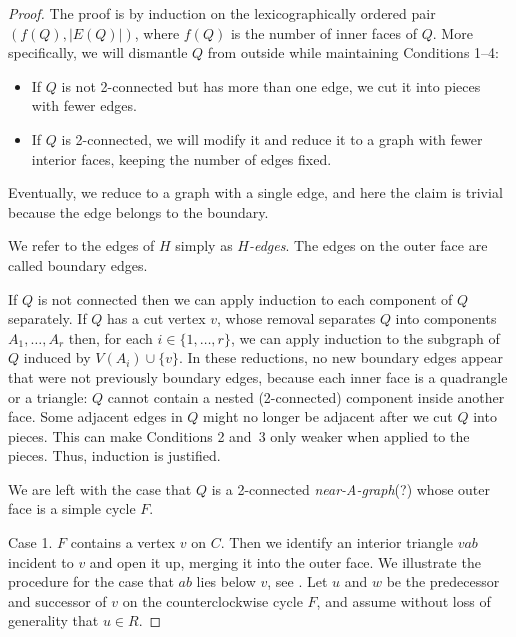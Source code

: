\documentclass{patmorin}
\begin{document}
\begin{proof}
The proof is by induction
   on the lexicographically ordered pair $(f(Q),|E(Q)|)$, where $f(Q)$
is the number of inner faces of $Q$. 
More specifically, %
we will dismantle $Q$
 from outside while maintaining
 Conditions 1--4:
\begin{itemize}
\item If $Q$ is not 2-connected but has more than one edge, we cut it
  into pieces with fewer edges.
\item If $Q$ is 2-connected, we will modify it and reduce it to a
  graph
with fewer interior faces,
keeping the number of edges fixed.
\end{itemize}
Eventually, we reduce to a graph with a single edge, and here the
claim is trivial because the edge belongs to the boundary.

   We refer to the edges of $H$ simply as \emph{$H$-edges}.
The edges on the outer
   face are called boundary edges.

If $Q$ is not connected then we can apply induction to each component
   of $Q$ separately. If $Q$ has a cut vertex $v$, whose removal
   separates $Q$ into components $A_1,\ldots,A_r$ then, for each
   $i\in\{1,\ldots,r\}$, we can apply induction to the subgraph of $Q$
   induced by $V(A_i)\cup\{v\}$.  
In these reductions, no new boundary edges appear that were not
previously boundary edges, because each inner face is
a quadrangle or a triangle: $Q$ cannot contain a nested (2-connected) component
inside another face.
Some adjacent edges in $Q$ might no longer be adjacent
after we cut $Q$ into pieces. This can make Conditions 2 and~3 only weaker
when applied to the pieces. Thus, induction is justified.

We are left with the case that $Q$ is a 2-connected \emph{near-A-graph}(?) whose outer face 
   is a simple cycle $F$.

Case 1. $F$ contains a vertex $v$ on $C$.
Then we identify an interior triangle $vab$ incident to $v$ and open it up,
merging it into the outer face.
We illustrate the procedure for the case that $ab$ lies below $v$, see
.
Let $u$ and $w$ be the predecessor and successor of $v$ on the
counterclockwise cycle $F$, and assume without loss of generality that $u\in R$.


\end{proof}
\end{document}
